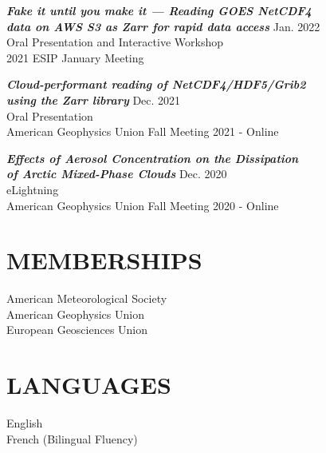 \documentclass[overlapped]{res}
\begin{document}
\begin{resume}
                {\sl \textbf{Fake it until you make it — Reading GOES NetCDF4 \\ data on AWS S3 as Zarr for rapid data access }} \hfill Jan. 2022 \\
                Oral Presentation and Interactive Workshop\\
                2021 ESIP January Meeting

                {\sl \textbf{Cloud-performant reading of NetCDF4/HDF5/Grib2\\ using the Zarr library}} \hfill Dec. 2021 \\
                Oral Presentation \\
                American Geophysics Union Fall Meeting 2021 - Online

                {\sl \textbf{Effects of Aerosol Concentration  on the Dissipation \\ of Arctic Mixed-Phase Clouds}} \hfill Dec. 2020 \\ 
                eLightning \\
                American Geophysics Union Fall Meeting 2020 - Online
                

                

\section{MEMBERSHIPS}            
                {American Meteorological Society} \\
                {American Geophysics Union} \\
                {European Geosciences Union}

\section{LANGUAGES}
                English \\
                French (Bilingual Fluency)

\end{resume}
\end{document}
